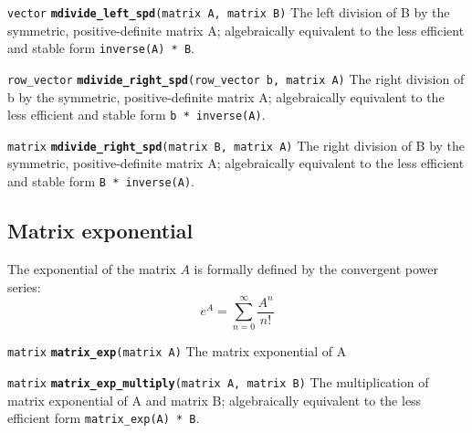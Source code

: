 \documentclass[
  10pt,
]{book}
\begin{document}

\texttt{vector} \textbf{\texttt{mdivide\_left\_spd}}\texttt{(matrix\ A,\ matrix\ B)}\newline
The left division of B by the symmetric, positive-definite matrix A;
algebraically equivalent to the less efficient and stable form
\texttt{inverse(A)\ *\ B}.


\texttt{row\_vector} \textbf{\texttt{mdivide\_right\_spd}}\texttt{(row\_vector\ b,\ matrix\ A)}\newline
The right division of b by the symmetric, positive-definite matrix A;
algebraically equivalent to the less efficient and stable form \texttt{b\ *\ inverse(A)}.


\texttt{matrix} \textbf{\texttt{mdivide\_right\_spd}}\texttt{(matrix\ B,\ matrix\ A)}\newline
The right division of B by the symmetric, positive-definite matrix A;
algebraically equivalent to the less efficient and stable form \texttt{B\ *\ inverse(A)}.

\hypertarget{matrix-exponential}{%
\subsection{Matrix exponential}\label{matrix-exponential}}

The exponential of the matrix \(A\) is formally defined by the
convergent power series: \[ e^A = \sum_{n=0}^{\infty} \dfrac{A^n}{n!}
\]


\texttt{matrix} \textbf{\texttt{matrix\_exp}}\texttt{(matrix\ A)}\newline
The matrix exponential of A


\texttt{matrix} \textbf{\texttt{matrix\_exp\_multiply}}\texttt{(matrix\ A,\ matrix\ B)}\newline
The multiplication of matrix exponential of A and matrix B;
algebraically equivalent to the less efficient form \texttt{matrix\_exp(A)\ *\ B}.
\end{document}
